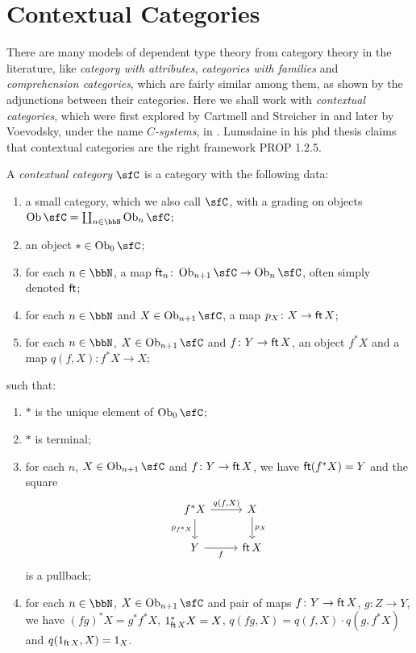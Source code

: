 \chapter{Contextual Categories}

There are many models of dependent type theory from category theory in
the literature, like \emph{category with attributes}, \emph{categories with
families} and \emph{comprehension categories}, which are
fairly similar among them, as shown by the adjunctions between their categories.
Here we shall work with \emph{contextual
categories}, which were first explored by Cartmell and Streicher in
 and later by Voevodsky, under the name $C$\emph{-systems},
in . Lumsdaine in his phd thesis claims that contextual
categories are the right framework PROP 1.2.5.

\begin{defn}
  A \emph{contextual category} $\sfC$ is a category with the following data:
  \begin{enumerate}
    \item a small category, which we also call $\sfC$, with a grading on objects
      $\Ob\sfC=\coprod_{n\in\bbN}\Ob_n\sfC$;
    \item an object $*\in\Ob_0\sfC$;
    \item for each $n\in\bbN$, a map
      $\cft_n\colon\Ob_{n+1}\sfC\rightarrow\Ob_n\sfC$, often simply denoted
      $\operatorname{\mathsf{ft}}$;
    \item for each $n\in\bbN$ and $X\in\Ob_{n+1}\sfC$, a map $p_X\colon
      X\rightarrow\operatorname{\mathsf{ft}} X$;
    \item for each $n\in\bbN$, $X\in\Ob_{n+1}\sfC$ and $f\colon Y\rightarrow
      \operatorname{\mathsf{ft}} X$, an object $f^*X$ and a map $q(f,X)\colon f^*X\rightarrow X$;
  \end{enumerate}
  such that:
  \begin{enumerate}
    \item $*$ is the unique element of $\Ob_0\sfC$;
    \item $*$ is terminal;
    \item for each $n$, $X\in\Ob_{n+1}\sfC$ and $f\colon Y\rightarrow \operatorname{\mathsf{ft}} X$, we
      have $\operatorname{\mathsf{ft}}(f^*X)=Y$ and the square
      \[\begin{tikzcd}
        {f^*X} & X \\
        Y & \cft X
        \arrow["f"', from=2-1, to=2-2]
        \arrow["{p_X}", from=1-2, to=2-2]
        \arrow["{q(f,X)}", from=1-1, to=1-2]
        \arrow["{p_{f^*X}}"', from=1-1, to=2-1]
      \end{tikzcd}\]
      is a pullback;
    \item for each $n\in\bbN$, $X\in\Ob_{n+1}\sfC$ and pair of maps $f\colon
      Y\rightarrow \operatorname{\mathsf{ft}} X$, $g\colon Z\rightarrow Y$, we have $(fg)^*X=g^*f^*X$,
      $1^*_{\operatorname{\mathsf{ft}} X}X=X$, $q(fg,X)=q(f,X)\cdot q(g,f^*X)$ and $q(1_{\operatorname{\mathsf{ft}} X},X)=1_X$.
  \end{enumerate}
\end{defn}

